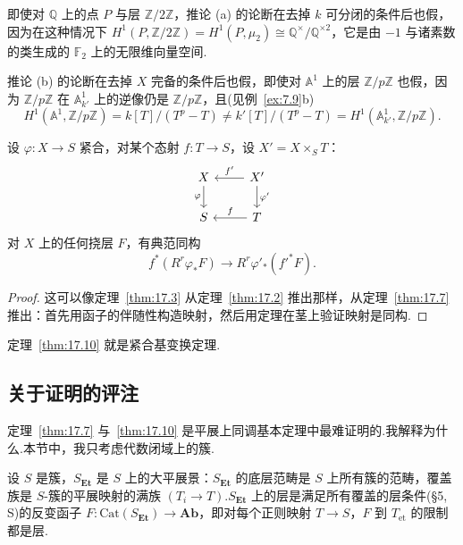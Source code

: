 \begin{remark}\label{rem:17.9}
即使对 $\mathbb{Q}$ 上的点 $P$ 与层 $\mathbb{Z}/2\mathbb{Z}$，推论 (a) 的论断在去掉 $k$ 可分闭的条件后也假，因为在这种情况下 $H^{1}(P, \mathbb{Z}/2\mathbb{Z}) = H^{1}(P, \mu_2) \cong \mathbb{Q}^{\times}/\mathbb{Q}^{\times 2}$，它是由 $-1$ 与诸素数的类生成的 $\mathbb{F}_2$ 上的无限维向量空间.

推论 (b) 的论断在去掉 $X$ 完备的条件后也假，即使对 $\mathbb{A}^{1}$ 上的层 $\mathbb{Z}/p\mathbb{Z}$ 也假，因为 $\mathbb{Z}/p\mathbb{Z}$ 在 $\mathbb{A}^{1}_{k'}$ 上的逆像仍是 $\mathbb{Z}/p\mathbb{Z}$，且(见例~\ref{ex:7.9}b)
\[
H^{1}(\mathbb{A}^{1}, \mathbb{Z}/p\mathbb{Z}) = k[T]/(T^{p} - T) \neq k'[T]/(T^{p} - T) = H^{1}(\mathbb{A}^{1}_{k'}, \mathbb{Z}/p\mathbb{Z}).
\]
\end{remark}

\begin{theorem}\label{thm:17.10}
设 $\varphi \colon X \to S$ 紧合，对某个态射 $f \colon T \to S$，设 $X' = X \times_{S} T$：
\[
\begin{tikzcd}
X \arrow[d, "\varphi"'] & X' \arrow[l, "f'"'] \arrow[d, "\varphi'"] \\
S & T \arrow[l, "f"']
\end{tikzcd}
\]
对 $X$ 上的任何挠层 $F$，有典范同构
\[
f^{*}(R^{r}\varphi_{*}F) \to R^{r}\varphi'_*(f'^{*}F).
\]
\end{theorem}

\begin{proof}
这可以像定理~\ref{thm:17.3} 从定理~\ref{thm:17.2} 推出那样，从定理~\ref{thm:17.7} 推出：首先用函子的伴随性构造映射，然后用定理在茎上验证映射是同构.
\end{proof}

定理~\ref{thm:17.10} 就是紧合基变换定理.

\subsection*{关于证明的评注}

定理~\ref{thm:17.7} 与~\ref{thm:17.10} 是平展上同调基本定理中最难证明的.我解释为什么.本节中，我只考虑代数闭域上的簇.

设 $S$ 是簇，$S_{\mathbf{Et}}$ 是 $S$ 上的大平展景：$S_{\mathbf{Et}}$ 的底层范畴是 $S$ 上所有簇的范畴，覆盖族是 $S$-簇的平展映射的满族 $(T_i \to T)$.$S_{\mathbf{Et}}$ 上的层是满足所有覆盖的层条件(\S 5, S)的反变函子 $F \colon \mathrm{Cat}(S_{\mathbf{Et}}) \to \mathbf{Ab}$，即对每个正则映射 $T \to S$，$F$ 到 $T_{\mathrm{et}}$ 的限制都是层.

